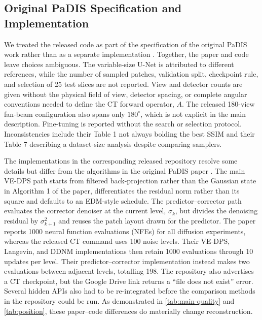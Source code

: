 \subsection{Original PaDIS Specification and Implementation}
\label{sec:discussion-reproducibility}

We treated the released code as part of the specification of the original PaDIS work rather than as a separate implementation \cite{hu_learning_2024,hu_jasonhu4padis_2026-1}. Together, the paper and code leave choices ambiguous. The variable-size U-Net is attributed to different references, while the number of sampled patches, validation split, checkpoint rule, and selection of 25 test slices are not reported. View and detector counts are given without the physical field of view, detector spacing, or complete angular conventions needed to define the CT forward operator, $A$. The released 180-view fan-beam configuration also spans only $180^\circ$, which is not explicit in the main description. Fine-tuning is reported without the search or selection protocol. Inconsistencies include their Table 1 not always bolding the best SSIM and their Table 7 describing a dataset-size analysis despite comparing samplers.

The implementations in the corresponding released repository resolve some details but differ from the algorithms in the original PaDIS paper \cite{hu_learning_2024,hu_jasonhu4padis_2026-1}. The main VE-DPS path starts from filtered back-projection rather than the Gaussian state in Algorithm 1 of the paper, differentiates the residual norm rather than its square and defaults to an EDM-style schedule. The predictor--corrector path evaluates the corrector denoiser at the current level, $\sigma_k$, but divides the denoising residual by $\sigma_{k+1}^2$ and reuses the patch layout drawn for the predictor. The paper reports 1000 neural function evaluations (NFEs) for all diffusion experiments, whereas the released CT command uses 100 noise levels. Their VE-DPS, Langevin, and DDNM implementations then retain 1000 evaluations through 10 updates per level. Their predictor--corrector implementation instead makes two evaluations between adjacent levels, totalling 198. The repository also advertises a CT checkpoint, but the Google Drive link returns a ``file does not exist'' error. Several hidden APIs also had to be re-integrated before the comparison methods in the repository could be run. As demonstrated in \autoref{tab:main-quality} and \autoref{tab:position}, these paper--code differences do materially change reconstruction.



